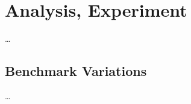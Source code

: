 

\chapter{Analysis, Experiment}
\label{cha:analysisexperiment}
\ldots

\section{Benchmark Variations}
\label{sec:analysis_benchmarkvariations}
\ldots



